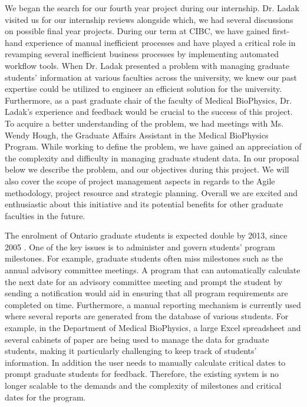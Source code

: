 \documentclass{journal}
\begin{document}
We began the search for our fourth year project during our internship. Dr. Ladak visited us for our internship reviews alongside which, we had several discussions on possible final year projects. During our term at CIBC, we have gained first-hand experience of manual inefficient processes and have played a critical role in revamping several inefficient business processes by implementing automated workflow tools. When Dr. Ladak presented a problem with managing graduate students’ information at various faculties across the university, we knew our past expertise could be utilized to engineer an efficient solution for the university. Furthermore, as a past graduate chair of the faculty of Medical BioPhysics, Dr. Ladak's experience and feedback would be crucial to the success of this project. To acquire a better understanding of the problem, we had meetings with Ms. Wendy Hough, the Graduate Affairs Assistant in the Medical BioPhysics Program. While working to define the problem, we have gained an appreciation of the complexity and difficulty in managing graduate student data. In our proposal below we describe the problem, and our objectives during this project. We will also cover the scope of project management aspects in regards to the Agile methodology, project resource and strategic planning. Overall we are excited and enthusiastic about this initiative and its potential benefits for other graduate faculties in the future.

The enrolment of Ontario graduate students is expected double by 2013, since 2005 \cite{con_high}.  One of the key issues is to administer and govern students' program milestones. For example, graduate students often miss milestones such as the annual advisory committee meetings. A program that can automatically calculate the next date for an advisory committee meeting and prompt the student by sending a notification would aid in ensuring that all program requirements are completed on time. Furthermore, a manual reporting mechanism is currently used where several reports are generated from the database of various students.
For example, in the Department of Medical BioPhysics, a large Excel spreadsheet and several cabinets of paper are being used to manage the data for graduate students, making it particularly challenging to keep track of students' information. In addition the user needs to manually calculate critical dates to prompt graduate students for feedback. Therefore, the existing system is no longer scalable to the demands and the complexity of milestones and critical dates for the program. 
\end{document}

